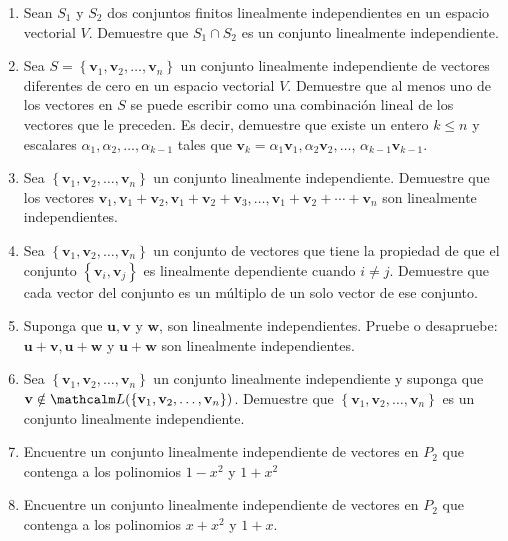 \begin{enumerate}[start=90]
    \item Sean $S_{1}$ y $S_{2}$ dos conjuntos finitos linealmente independientes en un espacio vectorial $V$. Demuestre que $S_{1} \cap S_{2}$ es un conjunto linealmente independiente.
    \item Sea $S=\left\{\mathbf{v}_{1}, \mathbf{v}_{2}, \dots, \mathbf{v}_{n}\right\}$ un conjunto linealmente independiente de vectores diferentes de cero en un espacio vectorial $V$. Demuestre que al menos uno de los vectores en $S$ se puede escribir como una combinación lineal de los vectores que le preceden. Es decir, demuestre que existe un entero $k \leq n$ y escalares $\alpha_{1}, \alpha_{2}, \dots, \alpha_{k-1}$ tales que $\mathbf{v}_{k}=\alpha_{1} \mathbf{v}_{1}, \alpha_{2} \mathbf{v}_{2}, \dots$, $\alpha_{k-1} \mathbf{v}_{k-1}$.
    \item Sea $\left\{\mathbf{v}_{1}, \mathbf{v}_{2}, \dots, \mathbf{v}_{n}\right\}$ un conjunto linealmente independiente. Demuestre que los vectores $\mathbf{v}_{1}, \mathbf{v}_{1}+\mathbf{v}_{2}, \mathbf{v}_{1}+\mathbf{v}_{2}+\mathbf{v}_{3}, \dots, \mathbf{v}_{1}+\mathbf{v}_{2}+\cdots+\mathbf{v}_{n}$ son linealmente independientes.
    \item Sea $\left\{\mathbf{v}_{1}, \mathbf{v}_{2}, \dots, \mathbf{v}_{n}\right\}$ un conjunto de vectores que tiene la propiedad de que el conjunto $\left\{\mathbf{v}_{i}, \mathbf{v}_{j}\right\}$ es linealmente dependiente cuando $i \neq j$. Demuestre que cada vector del conjunto es un múltiplo de un solo vector de ese conjunto.
    \item Suponga que $\mathbf{u}, \mathbf{v}$ y $\mathbf{w}$, son linealmente independientes. Pruebe o desapruebe: $\mathbf{u}+\mathbf{v}, \mathbf{u}+\mathbf{w}$ y $\mathbf{u}+\mathbf{w}$ son linealmente independientes.
    \item Sea $\left\{\mathbf{v}_{1}, \mathbf{v}_{2}, \dots, \mathbf{v}_{n}\right\}$ un conjunto linealmente independiente y suponga que $\mathbf{v} \notin \Gen ( \{\mathbf{v}_{1}, \mathbf{v}_{2}, \dots, \mathbf{v}_{n}\} )$. Demuestre que $\left\{\mathbf{v}_{1}, \mathbf{v}_{2}, \dots, \mathbf{v}_{n}\right\}$ es un conjunto linealmente independiente.
    \item Encuentre un conjunto linealmente independiente de vectores en $P_{2}$ que contenga a los polinomios $1-x^{2}$ y $1+x^{2}$
    \item Encuentre un conjunto linealmente independiente de vectores en $P_{2}$ que contenga a los polinomios $x+x^{2}$ y $1+x$.
\end{enumerate}
